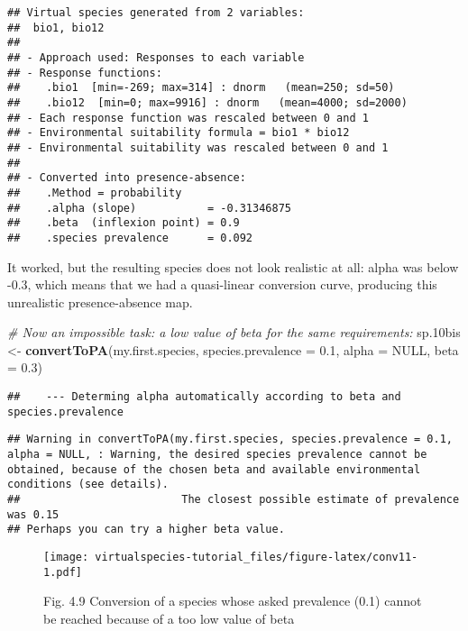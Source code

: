 \documentclass[]{article}
\newenvironment{Shaded}{\begin{snugshade}}{\end{snugshade}}
\newcommand{\KeywordTok}[1]{\textcolor[rgb]{0.13,0.29,0.53}{\textbf{#1}}}
\newcommand{\DataTypeTok}[1]{\textcolor[rgb]{0.13,0.29,0.53}{#1}}
\newcommand{\FloatTok}[1]{\textcolor[rgb]{0.00,0.00,0.81}{#1}}
\newcommand{\StringTok}[1]{\textcolor[rgb]{0.31,0.60,0.02}{#1}}
\newcommand{\CommentTok}[1]{\textcolor[rgb]{0.56,0.35,0.01}{\textit{#1}}}
\newcommand{\OtherTok}[1]{\textcolor[rgb]{0.56,0.35,0.01}{#1}}
\newcommand{\NormalTok}[1]{#1}
\begin{document}
\begin{verbatim}
## Virtual species generated from 2 variables:
##  bio1, bio12
## 
## - Approach used: Responses to each variable
## - Response functions:
##    .bio1  [min=-269; max=314] : dnorm   (mean=250; sd=50)
##    .bio12  [min=0; max=9916] : dnorm   (mean=4000; sd=2000)
## - Each response function was rescaled between 0 and 1
## - Environmental suitability formula = bio1 * bio12
## - Environmental suitability was rescaled between 0 and 1
## 
## - Converted into presence-absence:
##    .Method = probability
##    .alpha (slope)           = -0.31346875
##    .beta  (inflexion point) = 0.9
##    .species prevalence      = 0.092
\end{verbatim}

It worked, but the resulting species does not look realistic at all:
alpha was below -0.3, which means that we had a quasi-linear conversion
curve, producing this unrealistic presence-absence map.

\begin{Shaded}
\begin{Highlighting}[]
\CommentTok{# Now an impossible task: a low value of beta for the same requirements:}
\NormalTok{sp.10bis <-}\StringTok{ }\KeywordTok{convertToPA}\NormalTok{(my.first.species,}
                        \DataTypeTok{species.prevalence =} \FloatTok{0.1}\NormalTok{,}
                        \DataTypeTok{alpha =} \OtherTok{NULL}\NormalTok{,}
                        \DataTypeTok{beta =} \FloatTok{0.3}\NormalTok{)}
\end{Highlighting}
\end{Shaded}

\begin{verbatim}
##    --- Determing alpha automatically according to beta and species.prevalence
\end{verbatim}

\begin{verbatim}
## Warning in convertToPA(my.first.species, species.prevalence = 0.1, alpha = NULL, : Warning, the desired species prevalence cannot be obtained, because of the chosen beta and available environmental conditions (see details).
##                         The closest possible estimate of prevalence was 0.15 
## Perhaps you can try a higher beta value.
\end{verbatim}

\begin{figure}
\centering
\texttt{[image: virtualspecies-tutorial\_files/figure-latex/conv11-1.pdf]}
\caption{Fig. 4.9 Conversion of a species whose asked prevalence (0.1)
cannot be reached because of a too low value of beta}
\end{figure}
\end{document}
